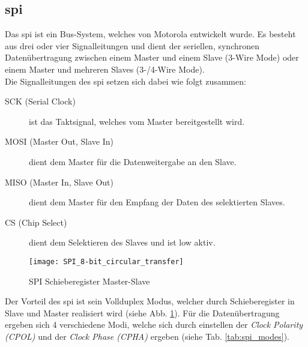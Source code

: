 \subsection{\acl{spi}}\label{subsec:spi}
Das \ac{spi} ist ein Bus-System, welches von Motorola entwickelt wurde. Es besteht aus drei oder vier Signalleitungen und dient der seriellen, synchronen Datenübertragung zwischen einem Master und einem Slave (3-Wire Mode) oder einem Master und mehreren Slaves (3-/4-Wire Mode). \\
Die Signalleitungen des \ac{spi} setzen sich dabei wie folgt zusammen:
\begin{description}
\item[SCK (Serial Clock)] ist das Taktsignal, welches vom Master bereitgestellt wird.
\item[MOSI (Master Out, Slave In)] dient dem Master für die Datenweitergabe an den Slave. 
\item[MISO (Master In, Slave Out)] dient dem Master für den Empfang der Daten des selektierten Slaves.
\item[CS (Chip Select)] dient dem Selektieren des Slaves und ist low aktiv.
\end{description}
\begin{figure}[h!t]
	\centering
  	\texttt{[image: SPI\_8-bit\_circular\_transfer]}
  	\caption{SPI Schieberegister Master-Slave}
  	\label{fig:SPI_Shift}
\end{figure}
Der Vorteil des \ac{spi} ist sein Vollduplex Modus, welcher durch Schieberegister in Slave und Master realisiert wird (siehe Abb. \ref{fig:SPI_Shift}). Für die Datenübertragung ergeben sich 4 verschiedene Modi, welche sich durch einstellen der \textit{Clock Polarity (CPOL)} und der \textit{Clock Phase (CPHA)} ergeben (siehe Tab. \ref{tab:spi_modes}). 
